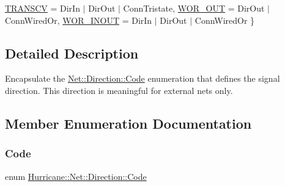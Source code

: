 \begin{DoxyCompactItemize}
\newline
\hyperlink{classHurricane_1_1Net_1_1Direction_a5b34d7c3ac52628861af3a46f781fae4ab8965ba57b68fc4b58c428fc4c8da397}{T\+R\+A\+N\+S\+CV} = Dir\+In $\vert$ Dir\+Out $\vert$ Conn\+Tristate, 
\newline
\hyperlink{classHurricane_1_1Net_1_1Direction_a5b34d7c3ac52628861af3a46f781fae4a1cc48f96bc28740eb7f0d7ba7e2b237c}{W\+O\+R\+\_\+\+O\+UT} = Dir\+Out $\vert$ Conn\+Wired\+Or, 
\newline
\hyperlink{classHurricane_1_1Net_1_1Direction_a5b34d7c3ac52628861af3a46f781fae4a2fbc95d7882aab3453d5549493763c3c}{W\+O\+R\+\_\+\+I\+N\+O\+UT} = Dir\+In $\vert$ Dir\+Out $\vert$ Conn\+Wired\+Or
 \}
\end{DoxyCompactItemize}


\subsection{Detailed Description}
Encapsulate the \hyperlink{classHurricane_1_1Net_1_1Direction_a5b34d7c3ac52628861af3a46f781fae4}{Net\+::\+Direction\+::\+Code} enumeration that defines the signal direction. This direction is meaningful for external nets only. 

\subsection{Member Enumeration Documentation}
\mbox{\label{classHurricane_1_1Net_1_1Direction_a5b34d7c3ac52628861af3a46f781fae4}} 
\subsubsection{\texorpdfstring{Code}{Code}}
{\footnotesize\ttfamily enum \hyperlink{classHurricane_1_1Net_1_1Direction_a5b34d7c3ac52628861af3a46f781fae4}{Hurricane\+::\+Net\+::\+Direction\+::\+Code}}

